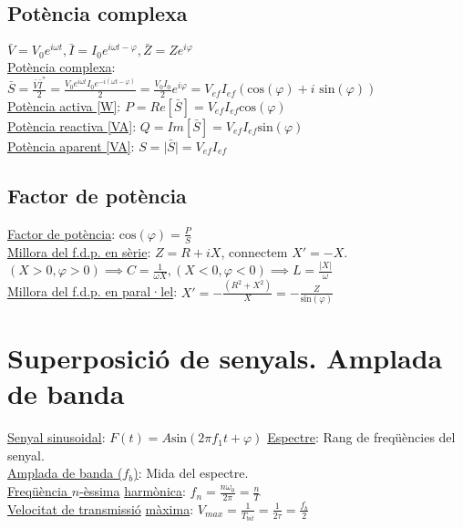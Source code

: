 \documentclass[12pt]{article}
\begin{document}
\begin{multicols}{5}
\subsection{Potència complexa}

$\bar{V} = V_0e^{i\omega t}, \bar{I} = I_0e^{i\omega t - \varphi}, \bar{Z} = Z e^{i\varphi}$ \\
\underline{Potència complexa}: $\bar{S} = \frac{\bar{V}\bar{I}^*}{2} = \frac{V_0e^{i\omega t}I_0e^{-i(\omega t - \varphi)}}{2} = \frac{V_0I_0}{2}e^{i\varphi} = V_{ef}I_{ef}(\text{cos}(\varphi) + i\text{ sin}(\varphi))$ \\
\underline{Potència activa [W]}: $P = Re[\bar{S}] = V_{ef}I_{ef}\text{cos}(\varphi)$ \\
\underline{Potència reactiva [VA]}: $Q = Im[\bar{S}] = V_{ef}I_{ef}\text{sin}(\varphi)$ \\
\underline{Potència aparent [VA]}: $S = \vert \bar{S} \vert = V_{ef}I_{ef}$ \\

\subsection{Factor de potència}

\underline{Factor de potència}: $\text{cos}(\varphi) = \frac{P}{S}$ \\
\underline{Millora del f.d.p. en sèrie}: $Z = R + iX$, connectem $X' = -X$. $(X>0,\varphi>0) \implies C=\frac{1}{\omega X}, (X<0, \varphi<0) \implies L=\frac{\vert X\vert}{\omega}$ \\
\underline{Millora del f.d.p. en paral·lel}: $X' = -\frac{(R^2+X^2)}{X} = -\frac{Z}{\text{sin}(\varphi)}$

\section{Superposició de senyals. Amplada de banda}

\underline{Senyal sinusoidal}: $F(t) = A\text{sin}(2\pi f_1t+ \varphi)$
\underline{Espectre}: Rang de freqüències del senyal. \\
\underline{Amplada de banda ($f_b$)}: Mida del espectre. \\
\underline{Freqüència $n$-èssima} \underline{harmònica}: $f_n = \frac{n\omega_0}{2\pi} = \frac{n}{T}$ \\
\underline{Velocitat de transmissió} \underline{màxima}: $V_{max} = \frac{1}{T_{bit}} = \frac{1}{2\tau} = \frac{f_b}{2}$ \\

\end{multicols}
\end{document}
